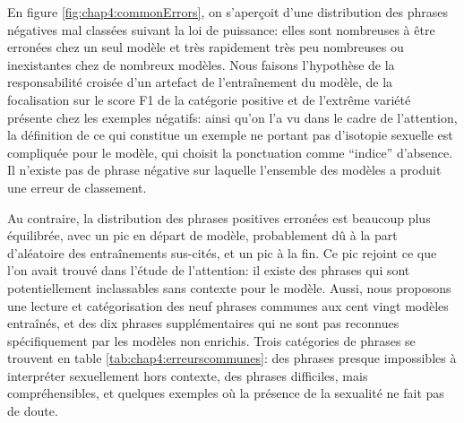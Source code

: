 
En figure \ref{fig:chap4:commonErrors}, on s'aperçoit d'une distribution des phrases négatives mal classées suivant la loi de puissance: elles sont nombreuses à être erronées chez un seul modèle et très rapidement très peu nombreuses ou inexistantes chez de nombreux modèles. Nous faisons l'hypothèse de la responsabilité croisée d'un artefact de l'entraînement du modèle, de la focalisation sur le score F1 de la catégorie positive et de l'extrême variété présente chez les exemples négatifs: ainsi qu'on l'a vu dans le cadre de l'attention, la définition de ce qui constitue un exemple ne portant pas d'isotopie sexuelle est compliquée pour le modèle, qui choisit la ponctuation comme ``indice'' d'absence. Il n'existe pas de phrase négative sur laquelle l'ensemble des modèles a produit une erreur de classement.

Au contraire, la distribution des phrases positives erronées est beaucoup plus équilibrée, avec un pic en départ de modèle, probablement dû à la part d'aléatoire des entraînements sus-cités, et un pic à la fin. Ce pic rejoint ce que l'on avait trouvé dans l'étude de l'attention: il existe des phrases qui sont potentiellement inclassables sans contexte pour le modèle. Aussi, nous proposons une lecture et catégorisation des neuf phrases communes aux cent vingt modèles entraînés, et des dix phrases supplémentaires qui ne sont pas reconnues spécifiquement par les modèles non enrichis. Trois catégories de phrases se trouvent en table \ref{tab:chap4:erreurscommunes}: des phrases presque impossibles à interpréter sexuellement hors contexte, des phrases difficiles, mais compréhensibles, et quelques exemples où la présence de la sexualité ne fait pas de doute.

